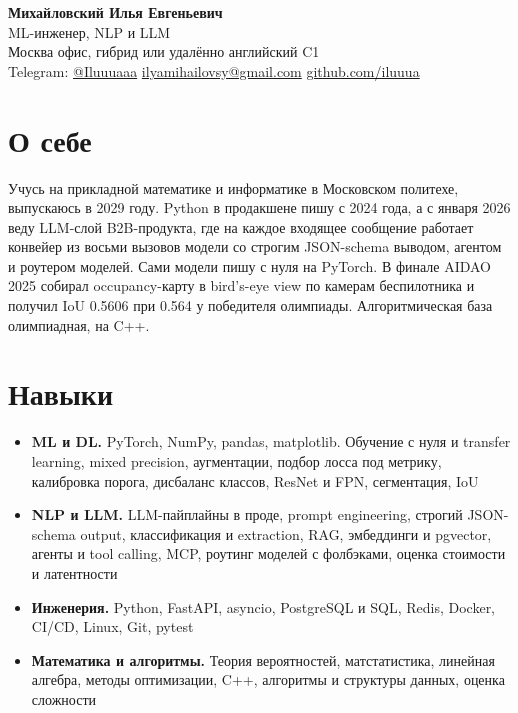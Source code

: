 \documentclass[10pt,a4paper]{article}
\begin{document}
\begin{center}
  {\LARGE\bfseries Михайловский Илья Евгеньевич}\\[2pt]
  {\large ML-инженер, NLP и LLM}\\[3pt]
  Москва \textperiodcentered{} офис, гибрид или удалённо \textperiodcentered{} английский C1\\[2pt]
  Telegram: \href{https://t.me/Iluuuaaa}{@Iluuuaaa} \textperiodcentered{}
  \href{mailto:ilyamihailovsy@gmail.com}{ilyamihailovsy@gmail.com} \textperiodcentered{}
  \href{https://github.com/iluuua}{github.com/iluuua}
\end{center}

\section{О себе}
Учусь на прикладной математике и информатике в Московском политехе, выпускаюсь в 2029 году. Python в продакшене
пишу с 2024 года, а с января 2026 веду LLM-слой B2B-продукта, где на каждое входящее сообщение работает конвейер
из восьми вызовов модели со строгим JSON-schema выводом, агентом и роутером моделей. Сами модели пишу с нуля
на PyTorch. В финале AIDAO 2025 собирал occupancy-карту в bird's-eye view по камерам беспилотника и получил
IoU 0.5606 при 0.564 у победителя олимпиады. Алгоритмическая база олимпиадная, на C++.

\section{Навыки}
\begin{itemize}
  \item \textbf{ML и DL.} PyTorch, NumPy, pandas, matplotlib. Обучение с нуля и transfer learning, mixed precision,
        аугментации, подбор лосса под метрику, калибровка порога, дисбаланс классов, ResNet и FPN, сегментация, IoU
  \item \textbf{NLP и LLM.} LLM-пайплайны в проде, prompt engineering, строгий JSON-schema output, классификация
        и extraction, RAG, эмбеддинги и pgvector, агенты и tool calling, MCP, роутинг моделей с фолбэками,
        оценка стоимости и латентности
  \item \textbf{Инженерия.} Python, FastAPI, asyncio, PostgreSQL и SQL, Redis, Docker, CI/CD, Linux, Git, pytest
  \item \textbf{Математика и алгоритмы.} Теория вероятностей, матстатистика, линейная алгебра, методы оптимизации,
        C++, алгоритмы и структуры данных, оценка сложности
\end{itemize}
\end{document}
